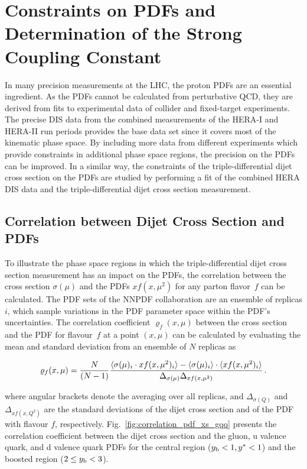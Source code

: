 \chapter{Constraints on PDFs and Determination of the Strong Coupling Constant}
\label{sec:pdf_constraints}

In many precision measurements at the LHC, the proton PDFs are an essential
ingredient. As the PDFs cannot be calculated from perturbative QCD, they are
derived from fits to experimental data of collider and fixed-target experiments.
The precise DIS data from the combined measurements of the HERA-I and HERA-II
run periods provides the base data set since it covers most of the kinematic phase space.
By including more data from different experiments which provide constraints in
additional phase space regions, the precision on the PDFs can be improved. In a
similar way, the constraints of the triple-differential dijet cross section on
the PDFs are studied by performing a fit of the combined HERA DIS data and the
triple-differential dijet cross section measurement.

\section{Correlation between Dijet Cross Section and PDFs}
\label{sec:pdf_sensitivity}

To illustrate the phase space regions in which the triple-differential dijet
cross section measurement has an impact on the PDFs, the correlation between the cross
section $\sigma(\mu)$ and the PDFs $xf(x,\mu^2)$ for any parton flavor~$f$ can be
calculated. The PDF sets of the NNPDF collaboration are an ensemble of replicas
$i$, which sample variations in the PDF parameter space within the PDF's
uncertainties. The correlation coefficient $\varrho_f(x,\mu)$ between the cross
section and the PDF for flavour~$f$ at a point $(x,\mu)$ can be calculated by
evaluating the mean and standard deviation from an ensemble of $N$ replicas as

\begin{equation}
  \varrho_f (x,\mu) =
  \frac{N}{(N-1)} \frac{%
    \langle \sigma(\mu)_i \cdot xf(x,\mu^2)_i \rangle -
    \langle \sigma(\mu)_i \rangle \cdot
    \langle xf(x,\mu^2)_i \rangle}
  {\Delta_{\sigma(\mu)} \Delta_{xf(x,\mu^2)}}\,.
\end{equation}

where angular brackets denote the averaging over all replicas, and
$\Delta_{\sigma(Q)}$ and $\Delta_{xf(x,Q^2)}$ are the standard deviations of the
dijet cross section and of the PDF with flavour $f$, respectively.
Fig.~\ref{fig:correlation_pdf_xs_gqq} presents the correlation coefficient
between the dijet cross section and the gluon, u valence quark, and d valence
quark PDFs for the central region ($y_{\mathrm{b}} < 1, y^* < 1$) and the
boosted region ($2 \leq y_{\mathrm{b}} < 3$).

